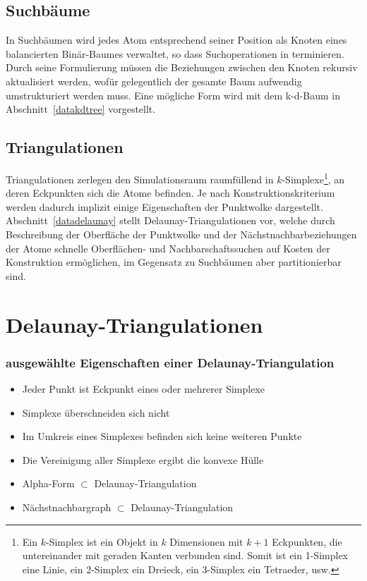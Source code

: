 \subsection{Suchbäume}
In Suchbäumen wird jedes Atom entsprechend seiner Position als Knoten eines balancierten Binär-Baumes verwaltet, so dass Suchoperationen in  terminieren.
Durch seine Formulierung müssen die Beziehungen zwischen den Knoten rekursiv aktualisiert werden, wofür gelegentlich der gesamte Baum aufwendig umstrukturiert werden muss.
Eine mögliche Form wird mit dem k-d-Baum in Abschnitt~\ref{datakdtree} vorgestellt.

\subsection{Triangulationen}
Triangulationen zerlegen den Simulationsraum raumfüllend in $k$-Simplexe\footnote{Ein $k$-Simplex ist ein Objekt in $k$ Dimensionen mit $k+1$ Eckpunkten, die untereinander mit geraden Kanten verbunden sind.
  Somit ist ein 1-Simplex eine Linie, ein 2-Simplex ein Dreieck, ein 3-Simplex ein Tetraeder, usw.}, an deren Eckpunkten sich die Atome befinden.
Je nach Konstruktionskriterium werden dadurch implizit einige Eigenschaften der Punktwolke dargestellt.
Abschnitt~\ref{datadelaunay} stellt Delaunay-Triangulationen vor, welche durch Beschreibung der Oberfläche der Punktwolke und der Nächstnachbarbeziehungen der Atome schnelle Oberflächen- und Nachbarschaftssuchen auf Kosten der Konstruktion ermöglichen, im Gegensatz zu Suchbäumen aber partitionierbar sind.

\section{Delaunay-Triangulationen}
\label{appendix_delaunay}

\subsubsection{ausgewählte Eigenschaften einer Delaunay-Triangulation}

\begin{itemize}
\item Jeder Punkt ist Eckpunkt eines oder mehrerer Simplexe
\item Simplexe überschneiden sich nicht
\item Im Umkreis eines Simplexes befinden sich keine weiteren Punkte
\item Die Vereinigung aller Simplexe ergibt die konvexe Hülle
\item Alpha-Form $\subset$ Delaunay-Triangulation
\item %
  Nächstnachbargraph $\subset$ Delaunay-Triangulation
\end{itemize}

